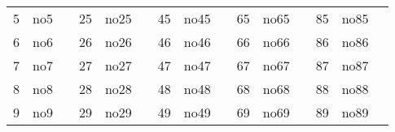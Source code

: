 \documentclass[12pt]{article}
\begin{document}
\begin{table}[]
\begin{tabular}{lllllllllllllll}
\multicolumn{1}{|l|}{5}  & 
\multicolumn{1}{l|}{no5}        & 
\multicolumn{1}{l|}{} & 
\multicolumn{1}{l|}{25} & 
\multicolumn{1}{l|}{no25}        & 
\multicolumn{1}{l|}{} & 
\multicolumn{1}{l|}{45} & 
\multicolumn{1}{l|}{no45}        & 
\multicolumn{1}{l|}{} & 
\multicolumn{1}{l|}{65} & 
\multicolumn{1}{l|}{no65}        & 
\multicolumn{1}{l|}{} & 
\multicolumn{1}{l|}{85}  & 
\multicolumn{1}{l|}{no85}        &  \\ \cline{1-2} \cline{4-5} \cline{7-8} \cline{10-11} \cline{13-14}


\multicolumn{1}{|l|}{6}  & 
\multicolumn{1}{l|}{no6}        & 
\multicolumn{1}{l|}{} & 
\multicolumn{1}{l|}{26} & 
\multicolumn{1}{l|}{no26}        & 
\multicolumn{1}{l|}{} & 
\multicolumn{1}{l|}{46} & 
\multicolumn{1}{l|}{no46}        & 
\multicolumn{1}{l|}{} & 
\multicolumn{1}{l|}{66} & 
\multicolumn{1}{l|}{no66}        & 
\multicolumn{1}{l|}{} & 
\multicolumn{1}{l|}{86}  & 
\multicolumn{1}{l|}{no86}        &  \\ \cline{1-2} \cline{4-5} \cline{7-8} \cline{10-11} \cline{13-14}


\multicolumn{1}{|l|}{7}  & 
\multicolumn{1}{l|}{no7}        & 
\multicolumn{1}{l|}{} & 
\multicolumn{1}{l|}{27} & 
\multicolumn{1}{l|}{no27}        & 
\multicolumn{1}{l|}{} & 
\multicolumn{1}{l|}{47} & 
\multicolumn{1}{l|}{no47}        & 
\multicolumn{1}{l|}{} & 
\multicolumn{1}{l|}{67} & 
\multicolumn{1}{l|}{no67}        & 
\multicolumn{1}{l|}{} & 
\multicolumn{1}{l|}{87}  & 
\multicolumn{1}{l|}{no87}        &  \\ \cline{1-2} \cline{4-5} \cline{7-8} \cline{10-11} \cline{13-14}


\multicolumn{1}{|l|}{8}  & 
\multicolumn{1}{l|}{no8}        & 
\multicolumn{1}{l|}{} & 
\multicolumn{1}{l|}{28} & 
\multicolumn{1}{l|}{no28}        & 
\multicolumn{1}{l|}{} & 
\multicolumn{1}{l|}{48} & 
\multicolumn{1}{l|}{no48}        & 
\multicolumn{1}{l|}{} & 
\multicolumn{1}{l|}{68} & 
\multicolumn{1}{l|}{no68}        & 
\multicolumn{1}{l|}{} & 
\multicolumn{1}{l|}{88}  & 
\multicolumn{1}{l|}{no88}        &  \\ \cline{1-2} \cline{4-5} \cline{7-8} \cline{10-11} \cline{13-14}


\multicolumn{1}{|l|}{9}  & 
\multicolumn{1}{l|}{no9}        & 
\multicolumn{1}{l|}{} & 
\multicolumn{1}{l|}{29} & 
\multicolumn{1}{l|}{no29}        & 
\multicolumn{1}{l|}{} & 
\multicolumn{1}{l|}{49} & 
\multicolumn{1}{l|}{no49}        & 
\multicolumn{1}{l|}{} & 
\multicolumn{1}{l|}{69} & 
\multicolumn{1}{l|}{no69}        & 
\multicolumn{1}{l|}{} & 
\multicolumn{1}{l|}{89}  & 
\multicolumn{1}{l|}{no89}        &  \\ \cline{1-2} \cline{4-5} \cline{7-8} \cline{10-11} \cline{13-14}



\end{tabular}
\end{table}
\end{document}
